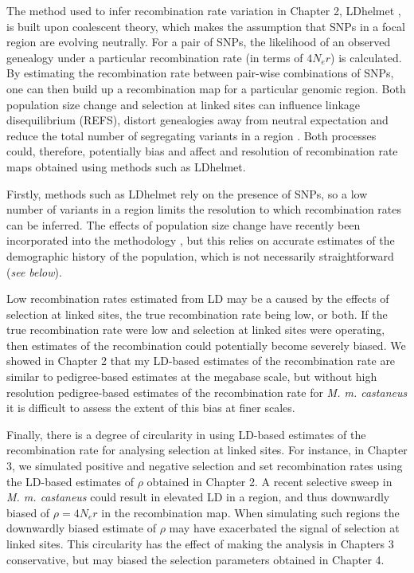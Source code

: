	The method used to infer recombination rate variation in Chapter 2, LDhelmet \citep{RN213}, is built upon coalescent theory, which makes the assumption that SNPs in a focal region are evolving neutrally. For a pair of SNPs, the likelihood of an observed genealogy under a particular recombination rate (in terms of $4N_er$) is calculated. By estimating the recombination rate between pair-wise combinations of SNPs, one can then build up a recombination map for a particular genomic region. Both population size change and selection at linked sites can influence linkage disequilibrium (REFS), distort genealogies away from neutral expectation \citep{RN192} and reduce the total number of segregating variants in a region \citep{RN287}. Both processes could, therefore, potentially bias and affect and resolution of recombination rate maps obtained using methods such as LDhelmet.
		
	Firstly, methods such as LDhelmet rely on the presence of SNPs, so a low number of variants in a region limits the resolution to which recombination rates can be inferred. The effects of population size change have recently been incorporated into the methodology \citep{RN381}, but this relies on accurate estimates of the demographic history of the population, which is not necessarily straightforward (\textit{see below}).
	
	Low recombination rates estimated from LD may be a caused by the effects of selection at linked sites, the true recombination rate being low, or both. If the true recombination rate were low and selection at linked sites were operating, then estimates of the recombination could potentially become severely biased. We showed in Chapter 2 that my LD-based estimates of the recombination rate are similar to pedigree-based estimates at the megabase scale, but without high resolution pedigree-based estimates of the recombination rate for \textit{M. m. castaneus} it is difficult to assess the extent of this bias at finer scales. 
	
	Finally, there is a degree of circularity in using LD-based estimates of the recombination rate for analysing selection at linked sites. For instance, in Chapter 3, we simulated positive and negative selection and set recombination rates using the LD-based estimates of $\rho$ obtained in Chapter 2. A recent selective sweep in \textit{M. m. castaneus} could result in elevated LD in a region, and thus downwardly biased of $\rho = 4N_er$ in the recombination map. When simulating such regions the downwardly biased estimate of $\rho$ may have exacerbated the signal of selection at linked sites. This circularity has the effect of making the analysis in Chapters 3 conservative, but may biased the selection parameters obtained in Chapter 4.

